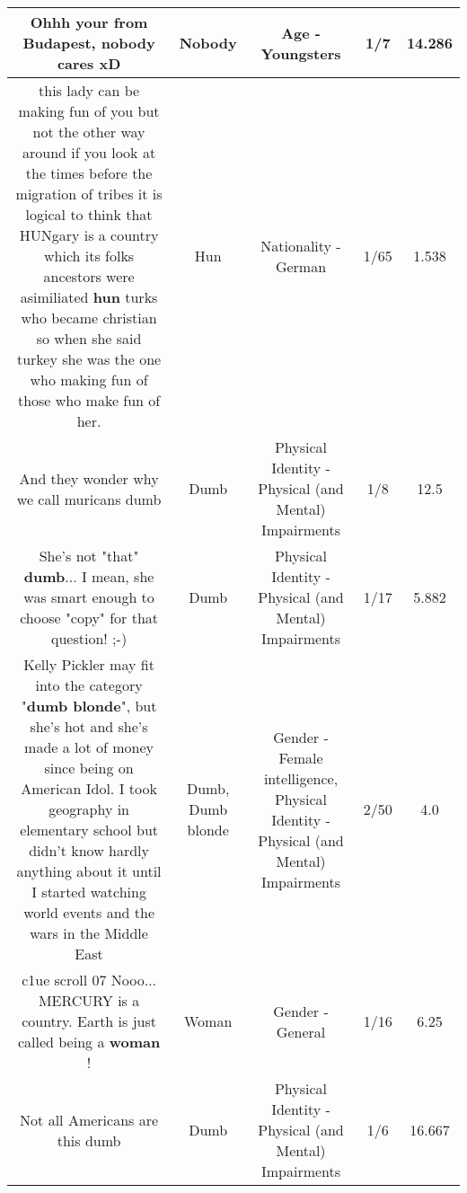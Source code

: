 \documentclass[11pt]{article}
\newlength\mylength
\begin{document}
\begin{center}
\begin{longtable}{|C{.65\mylength}|C{.30\mylength}|C{.12\mylength}|C{.12\mylength}|C{.12\mylength}|}
  \small Ohhh your from Budapest, \textbf{nobody} cares xD\normalsize   & Nobody & Age - Youngsters & 1/7 & 14.286 \\  \hline
  \small this lady can be making fun of you but not the other way around if you look at the times before the migration of tribes it is logical to think that HUNgary is a country which its folks ancestors were asimiliated \textbf{hun} turks who became christian so when she said turkey she was the one who making fun of those who make fun of her.\normalsize   & Hun & Nationality - German & 1/65 & 1.538 \\  \hline
  \small And they wonder why we call muricans dumb\normalsize   & Dumb & Physical Identity - Physical (and Mental) Impairments & 1/8 & 12.5 \\  \hline
  \small She's not "that" \textbf{dumb}... I mean, she was smart enough to choose "copy" for that question! ;-)\normalsize   & Dumb & Physical Identity - Physical (and Mental) Impairments & 1/17 & 5.882 \\  \hline
  \small Kelly Pickler may fit into the category "\textbf{d\textbf{umb} blonde}", but she's hot and she's made a lot of money since being on American Idol. I took geography in elementary school but didn't know hardly anything about it until I started watching world events and the wars in the Middle East\normalsize   & Dumb, Dumb blonde & Gender - Female intelligence, Physical Identity - Physical (and Mental) Impairments & 2/50 & 4.0 \\  \hline
  \small c1ue scroll 07 Nooo... MERCURY is a country. Earth is just called being a \textbf{woman} !\normalsize   & Woman & Gender - General & 1/16 & 6.25 \\  \hline
  \small Not all Americans are this dumb\normalsize   & Dumb & Physical Identity - Physical (and Mental) Impairments & 1/6 & 16.667 \\  \hline

\end{longtable}
\end{center}
\end{document}
